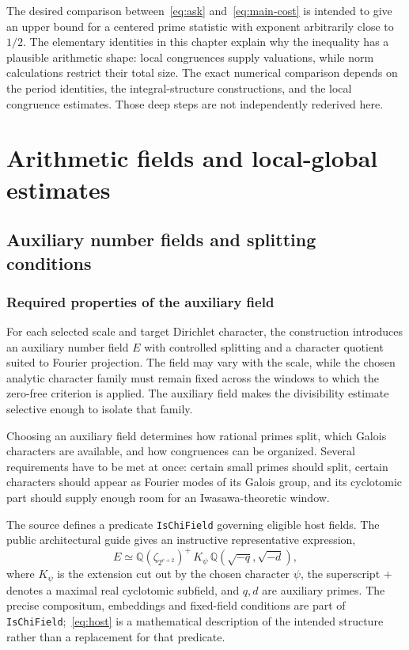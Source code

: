 \documentclass[11pt,openany,oneside]{scrbook}
\theoremstyle{definition}
\theoremstyle{remark}
\newcommand{\QQ}{\mathbb Q}
\begin{document}
The desired comparison between~\eqref{eq:ask} and~\eqref{eq:main-cost} is intended to give an upper bound for a centered prime statistic with exponent arbitrarily close to $1/2$. The elementary identities in this chapter explain why the inequality has a plausible arithmetic shape: local congruences supply valuations, while norm calculations restrict their total size. The exact numerical comparison depends on the period identities, the integral-structure constructions, and the local congruence estimates. Those deep steps are not independently rederived here.

\part{Arithmetic fields and local-global estimates}

\chapter{Auxiliary number fields and splitting conditions}\label{ch:hosts}

\section{Required properties of the auxiliary field}

For each selected scale and target Dirichlet character, the construction introduces an auxiliary number field $E$ with controlled splitting and a character quotient suited to Fourier projection. The field may vary with the scale, while the chosen analytic character family must remain fixed across the windows to which the zero-free criterion is applied. The auxiliary field makes the divisibility estimate selective enough to isolate that family.

Choosing an auxiliary field determines how rational primes split, which Galois characters are available, and how congruences can be organized. Several requirements have to be met at once: certain small primes should split, certain characters should appear as Fourier modes of its Galois group, and its cyclotomic part should supply enough room for an Iwasawa-theoretic window.

The source defines a predicate \texttt{IsChiField} governing eligible host fields. The public architectural guide gives an instructive representative expression,
\begin{equation}\label{eq:host}
E\simeq\QQ(\zeta_{2^{e+2}})^+\,K_\psi\,
\QQ(\sqrt{-q},\sqrt{-d}),
\end{equation}
where $K_\psi$ is the extension cut out by the chosen character $\psi$, the superscript $+$ denotes a maximal real cyclotomic subfield, and $q,d$ are auxiliary primes. The precise compositum, embeddings and fixed-field conditions are part of \texttt{IsChiField};~\eqref{eq:host} is a mathematical description of the intended structure rather than a replacement for that predicate.
\end{document}
